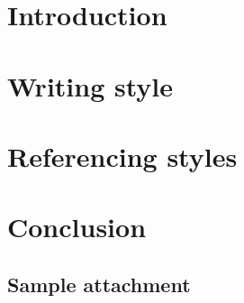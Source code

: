 \documentclass[ieee]{tauthesis}
\begin{document}

    \glsaddall
    \setlength{\glsnamewidth}{0.25\textwidth}
    \setlength{\glsdescwidth}{0.75\textwidth}
    \renewcommand*{\glsgroupskip}{}

    \printglossary[title={Glossary}]


\fi

\clearpage
{}
\setcounter{page}{1}


\chapter{Introduction}
\label{ch:introduction}



\chapter{Writing style}
\label{ch:writing style}



\chapter{Referencing styles}
\label{ch:referencing styles}


\chapter{Conclusion}
\label{ch:conclusion}



\ifdraftmode\else

    \printbibliography[heading=bibintoc]
\fi



    \begin{appendices}

        \chapter{Sample attachment}
        \label{ch:appendix}
        

    \end{appendices}
\end{document}
